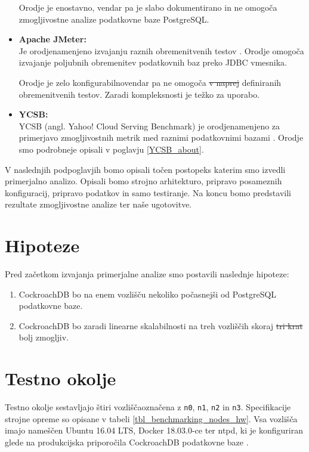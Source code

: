 \documentclass[a4paper, 12pt]{book}
\providecommand{\DIFaddtex}[1]{{\protect\color{blue}\uwave{#1}}} %
\providecommand{\DIFdeltex}[1]{{\protect\color{red}\sout{#1}}}                      %
\providecommand{\DIFaddbegin}{} %
\providecommand{\DIFaddend}{} %
\providecommand{\DIFdelbegin}{} %
\providecommand{\DIFdelend}{} %
\providecommand{\DIFadd}[1]{\texorpdfstring{\DIFaddtex{#1}}{#1}} %
\providecommand{\DIFdel}[1]{\texorpdfstring{\DIFdeltex{#1}}{}} %
\newcommand{\DIFscaledelfig}{0.5}
\newlength{\DIFdelgraphicswidth} %
\newlength{\DIFdelgraphicsheight} %
\newcommand{\DIFaddincludegraphics}[2][]{{\color{blue}\fbox{\DIFOincludegraphics[#1]{#2}}}} %
\newcommand{\DIFdelincludegraphics}[2][]{%
\sbox{\DIFdelgraphicsbox}{\DIFOincludegraphics[#1]{#2}}%
\settoboxwidth{\DIFdelgraphicswidth}{\DIFdelgraphicsbox} %
\settoboxtotalheight{\DIFdelgraphicsheight}{\DIFdelgraphicsbox} %
\scalebox{\DIFscaledelfig}{%
\parbox[b]{\DIFdelgraphicswidth}{\usebox{\DIFdelgraphicsbox}\\[-\baselineskip] \rule{\DIFdelgraphicswidth}{0em}}\llap{\resizebox{\DIFdelgraphicswidth}{\DIFdelgraphicsheight}{%
\setlength{\unitlength}{\DIFdelgraphicswidth}%
\begin{picture}(1,1)%
\thicklines\linethickness{2pt} %
{\color[rgb]{1,0,0}\put(0,0){\framebox(1,1){}}}%
{\color[rgb]{1,0,0}\put(0,0){\line( 1,1){1}}}%
{\color[rgb]{1,0,0}\put(0,1){\line(1,-1){1}}}%
\end{picture}%
}\hspace*{3pt}}} %
} %
\DeclareRobustCommand{\DIFaddbegin}{\DIFOaddbegin \let\includegraphics\DIFaddincludegraphics} %
\DeclareRobustCommand{\DIFaddend}{\DIFOaddend \let\includegraphics\DIFOincludegraphics} %
\DeclareRobustCommand{\DIFdelbegin}{\DIFOdelbegin \let\includegraphics\DIFdelincludegraphics} %
\DeclareRobustCommand{\DIFdelend}{\DIFOaddend \let\includegraphics\DIFOincludegraphics} %
\begin{document}
\begin{itemize}
    Orodje je enostavno, vendar pa je slabo dokumentirano in ne omogoča zmogljivostne analize podatkovne baze PostgreSQL.
    \item \textbf{Apache JMeter:}\\ Je orodje\DIFaddbegin \DIFadd{, }\DIFaddend namenjeno izvajanju raznih obremenitvenih testov \cite{jmeter}. Orod\-je omogoča izvajanje poljubnih obremenitev podatkovnih baz preko JDBC vmesnika.

    Orodje je zelo konfigurabilno\DIFaddbegin \DIFadd{, }\DIFaddend vendar pa ne omogoča \DIFdelbegin \DIFdel{v naprej }\DIFdelend \DIFaddbegin \DIFadd{vnaprej }\DIFaddend definiranih obremenitvenih testov. Zaradi kompleksnosti je težko za uporabo.
    \item \textbf{YCSB:}\\ YCSB (angl. Yahoo! Cloud Serving Benchmark) je orodje\DIFaddbegin \DIFadd{, }\DIFaddend namenjeno za primerjavo zmogljivostnih metrik med raznimi podatkovnimi bazami \cite{brianfrankcooper/YCSB}. Orodje smo podrobneje opisali v poglavju \ref{YCSB_about}.
\end{itemize}

V naslednjih podpoglavjih bomo opisali točen postopek\DIFaddbegin \DIFadd{, }\DIFaddend s katerim smo izvedli primerjalno analizo. Opisali bomo strojno arhitekturo, pripravo posameznih konfiguracij, pripravo podatkov in samo testiranje. Na koncu bomo predstavili rezultate zmogljivostne analize ter naše ugotovitve.

\section{Hipoteze}
Pred začetkom izvajanja primerjalne analize smo postavili naslednje hipoteze:
\begin{enumerate}
    \item CockroachDB bo na enem vozlišču nekoliko počasnejši od PostgreSQL podatkovne baze.

    \item CockroachDB bo zaradi linearne skalabilnosti na treh vozliščih skoraj \DIFdelbegin \DIFdel{tri krat }\DIFdelend \DIFaddbegin \DIFadd{trikrat }\DIFaddend bolj zmogljiv.
\end{enumerate}

\section{Testno okolje}
Testno okolje sestavljajo štiri vozlišča\DIFaddbegin \DIFadd{, }\DIFaddend označena z \texttt{n0}, \texttt{n1}, \texttt{n2} in \texttt{n3}. Specifikacije strojne opreme so opisane v tabeli \ref{tbl_benchmarking_nodes_hw}. Vsa vozlišča imajo nameščen Ubuntu 16.04 LTS, Docker 18.03.0-ce ter ntpd, ki je konfiguriran glede na produkcijska priporočila  CockroachDB podatkovne baze \cite{CRDB-ntpd-configuration}.
\end{document}
